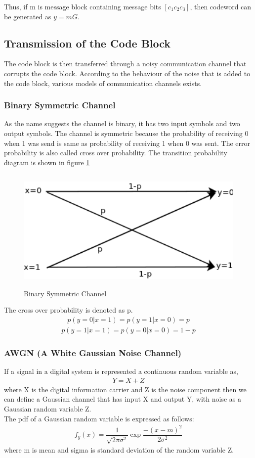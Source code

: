 Thus, if m is message block containing message bits $[c_1 c_2 c_3]$, then codeword can be generated as $y=mG$.

\subsection{Transmission of the Code Block}
The code block is then transferred through a noisy communication channel that corrupts the code block. According to the behaviour of the noise that is added to the code block, various models of communication channels exists. 
\subsubsection{Binary Symmetric Channel}
 As the name suggests the channel is binary, it has two input symbols and two output symbols. The channel is symmetric because the probability of receiving 0 when 1 was send is same as probability of receiving 1 when 0 was sent. The error probability is also called cross over probability. The transition probability diagram is shown in figure \ref{bsc}
 \begin{figure}[h]
\centering
\includegraphics[height=6cm,width=12cm]{bsc}
\caption[Transition probability diagram of Binary Symmetric Channel]{Binary Symmetric Channel}
\label{bsc}
\end{figure}
The cross over probability is denoted as p.
\begin{align} p(y=0|x=1) = p(y=1|x=0) = p  \end{align}
\begin{align} p(y=1|x=1) = p(y=0|x=0) = 1-p  \end{align}
\subsubsection{AWGN (A White Gaussian Noise Channel)}
If a signal in a digital system is represented a continuous random variable as,
\begin{align} Y = X + Z \end{align}
where X is the digital information carrier and Z is the noise component then we can define a Gaussian channel that has input X and output Y, with noise as a Gaussian random variable Z. \\
The pdf of a Gaussian random variable is expressed as follows: \\
\begin{align} f_y(x) = \dfrac{1}{\sqrt{2\pi\sigma^{2}}} \exp{\dfrac{-(x-m)^2}{2\sigma^2}}
 \end{align} 
where m is mean and sigma is standard deviation of the random variable Z.
